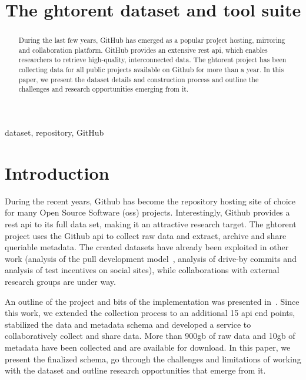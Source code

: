 \documentclass[conference]{IEEEtran}
\begin{document}
\title{The {\sc ght}orent dataset and tool suite}

\author{ 
}

\maketitle

\begin{abstract} 
  
  During the last few years, GitHub has emerged as a popular project hosting,
  mirroring and collaboration platform. GitHub provides an extensive {\sc rest
  api}, which enables researchers to retrieve high-quality, interconnected data.
  The {\sc ght}orent project has been collecting data for all public projects
  available on Github for more than a year. In this paper, we present the dataset
  details and construction process and outline the challenges and research
  opportunities emerging from it.

\end{abstract}

\begin{IEEEkeywords}
dataset, repository, GitHub
\end{IEEEkeywords}

\section{Introduction} During the recent years, Github has become the repository
hosting site of choice for many Open Source Software ({\sc oss}) projects.
Interestingly, Github provides a {\sc rest api} to its full data set, making it
an attractive research target. The {\sc ght}orent project uses the Github {\sc api}
to collect raw data and extract, archive and share queriable metadata. The
created datasets have already been exploited in other work (analysis of the pull
development model~\cite{GPD13}, analysis of drive-by commits and analysis of
test incentives on social sites),
while collaborations with external research groups are under way. 

An outline of the project and bits of the implementation was presented in~\cite{GS12}. Since this work, we extended the collection process to
an additional 15 {\sc api} end points, stabilized the data and metadata
schema and developed a service to collaboratively collect and share data. More
than 900{\sc gb} of raw data and 10{\sc gb} of metadata have been collected
and are available for download.
In this paper, we present the finalized schema, go through the challenges and limitations of working with the dataset and outline research
opportunities that emerge from it.
\end{document}
